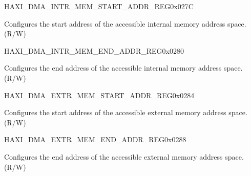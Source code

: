 \begin{register}{H}{AXI\_DMA\_INTR\_MEM\_START\_ADDR\_REG}{0x027C}\label{regdesc:AXIDMAINTRMEMSTARTADDRREG}
%
\regnewline%
\begin{regdesc}\begin{reglist}
\label{fielddesc:AXIDMAACCESSINTRMEMSTARTADDR}\item [AXI\_DMA\_ACCESS\_INTR\_MEM\_START\_ADDR] Configures the start address of the accessible internal memory address space. (R/W)
\end{reglist}\end{regdesc}
\end{register}


\begin{register}{H}{AXI\_DMA\_INTR\_MEM\_END\_ADDR\_REG}{0x0280}\label{regdesc:AXIDMAINTRMEMENDADDRREG}
%
\regnewline%
\begin{regdesc}\begin{reglist}
\label{fielddesc:AXIDMAACCESSINTRMEMENDADDR}\item [AXI\_DMA\_ACCESS\_INTR\_MEM\_END\_ADDR] Configures the end address of the accessible internal memory address space. (R/W)
\end{reglist}\end{regdesc}
\end{register}


\begin{register}{H}{AXI\_DMA\_EXTR\_MEM\_START\_ADDR\_REG}{0x0284}\label{regdesc:AXIDMAEXTRMEMSTARTADDRREG}
%
\regnewline%
\begin{regdesc}\begin{reglist}
\label{fielddesc:AXIDMAACCESSEXTRMEMSTARTADDR}\item [AXI\_DMA\_ACCESS\_EXTR\_MEM\_START\_ADDR] Configures the start address of the accessible external memory address space. (R/W)
\end{reglist}\end{regdesc}
\end{register}


\begin{register}{H}{AXI\_DMA\_EXTR\_MEM\_END\_ADDR\_REG}{0x0288}\label{regdesc:AXIDMAEXTRMEMENDADDRREG}
%
\regnewline%
\begin{regdesc}\begin{reglist}
\label{fielddesc:AXIDMAACCESSEXTRMEMENDADDR}\item [AXI\_DMA\_ACCESS\_EXTR\_MEM\_END\_ADDR] Configures the end address of the accessible external memory address space. (R/W)
\end{reglist}\end{regdesc}
\end{register}


